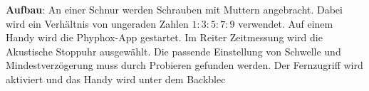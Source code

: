 \documentclass[../main.tex]{subfiles}
\begin{document}
\begin{tcolorbox}
\begin{minipage}[]{0.75\textwidth}
        \vspace{0.4cm}
        \textbf{Aufbau}: An einer Schnur werden Schrauben mit Muttern angebracht. Dabei wird ein Verhältnis von ungeraden Zahlen $1:3:5:7:9$ verwendet. Auf einem Handy wird die Phyphox-App gestartet. Im Reiter \glqq Zeitmessung\grqq{} wird die \glqq Akustische Stoppuhr\grqq{} ausgewählt. Die passende Einstellung von Schwelle und Mindestverzögerung muss durch Probieren gefunden werden. Der Fernzugriff wird aktiviert und das Handy wird unter dem Backblec
\end{minipage}
\end{tcolorbox}
\end{document}
